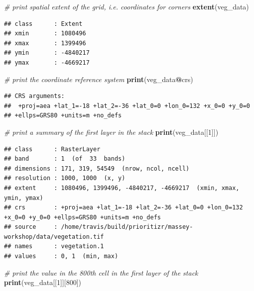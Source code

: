 \documentclass[12pt,]{book}
\newenvironment{Shaded}{\begin{snugshade}}{\end{snugshade}}
\newcommand{\KeywordTok}[1]{\textcolor[rgb]{0.13,0.29,0.53}{\textbf{#1}}}
\newcommand{\DecValTok}[1]{\textcolor[rgb]{0.00,0.00,0.81}{#1}}
\newcommand{\CommentTok}[1]{\textcolor[rgb]{0.56,0.35,0.01}{\textit{#1}}}
\newcommand{\OperatorTok}[1]{\textcolor[rgb]{0.81,0.36,0.00}{\textbf{#1}}}
\newcommand{\NormalTok}[1]{#1}
\begin{document}
\begin{Shaded}
\begin{Highlighting}[]
\CommentTok{# print spatial extent of the grid, i.e. coordinates for corners}
\KeywordTok{extent}\NormalTok{(veg_data)}
\end{Highlighting}
\end{Shaded}

\begin{verbatim}
## class      : Extent 
## xmin       : 1080496 
## xmax       : 1399496 
## ymin       : -4840217 
## ymax       : -4669217
\end{verbatim}

\begin{Shaded}
\begin{Highlighting}[]
\CommentTok{# print the coordinate reference system}
\KeywordTok{print}\NormalTok{(veg_data}\OperatorTok{@}\NormalTok{crs)}
\end{Highlighting}
\end{Shaded}

\begin{verbatim}
## CRS arguments:
##  +proj=aea +lat_1=-18 +lat_2=-36 +lat_0=0 +lon_0=132 +x_0=0 +y_0=0
## +ellps=GRS80 +units=m +no_defs
\end{verbatim}

\begin{Shaded}
\begin{Highlighting}[]
\CommentTok{# print a summary of the first layer in the stack}
\KeywordTok{print}\NormalTok{(veg_data[[}\DecValTok{1}\NormalTok{]])}
\end{Highlighting}
\end{Shaded}

\begin{verbatim}
## class      : RasterLayer 
## band       : 1  (of  33  bands)
## dimensions : 171, 319, 54549  (nrow, ncol, ncell)
## resolution : 1000, 1000  (x, y)
## extent     : 1080496, 1399496, -4840217, -4669217  (xmin, xmax, ymin, ymax)
## crs        : +proj=aea +lat_1=-18 +lat_2=-36 +lat_0=0 +lon_0=132 +x_0=0 +y_0=0 +ellps=GRS80 +units=m +no_defs 
## source     : /home/travis/build/prioritizr/massey-workshop/data/vegetation.tif 
## names      : vegetation.1 
## values     : 0, 1  (min, max)
\end{verbatim}

\begin{Shaded}
\begin{Highlighting}[]
\CommentTok{# print the value in the 800th cell in the first layer of the stack}
\KeywordTok{print}\NormalTok{(veg_data[[}\DecValTok{1}\NormalTok{]][}\DecValTok{800}\NormalTok{])}
\end{Highlighting}
\end{Shaded}
\end{document}
